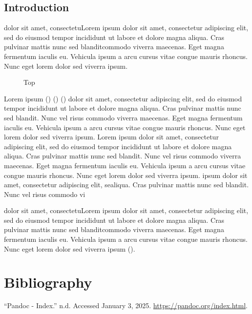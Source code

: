\subsection{Introduction}\label{introduction}

\hspace{0pt}dolor sit amet, consectetuLorem ipsum dolor sit amet,
consectetur adipiscing elit, sed do eiusmod tempor incididunt ut labore
et dolore magna aliqua. Cras pulvinar mattis nunc sed blanditcommodo
viverra maecenas. Eget magna fermentum iaculis eu. Vehicula ipsum a arcu
cursus vitae congue mauris rhoncus. Nunc eget lorem dolor sed viverra
ipsum. \hspace{0pt}

 \begin{wrapfigure}[25]{o}{5.4083333333333in}

\centering 

\caption{Top}\label{fig:top}

 \end{wrapfigure}

Lorem ipsum (\ada) (\tsa) (\trs) dolor sit amet, consectetur adipiscing
elit, sed do eiusmod tempor incididunt ut labore et dolore magna aliqua.
Cras \tsa pulvinar mattis nunc sed blandit. Nunc vel risus commodo
viverra maecenas. Eget magna fermentum iaculis eu. Vehicula ipsum a arcu
cursus vitae congue mauris rhoncus. Nunc eget lorem dolor sed viverra
ipsum. Lorem ipsum dolor sit amet, consectetur adipiscing elit, sed do
eiusmod tempor incididunt ut labore et dolore magna aliqua. Cras
pulvinar mattis nunc sed blandit. Nunc vel risus commodo viverra
maecenas. Eget magna fermentum iaculis eu. Vehicula ipsum a arcu cursus
vitae congue mauris rhoncus. Nunc eget lorem dolor sed viverra ipsum.
ipsum dolor sit amet, consectetur adipiscing elit, sealiqua. Cras
pulvinar mattis nunc sed blandit. Nunc vel risus commodo vi

dolor sit amet, consectetuLorem ipsum dolor sit amet, consectetur
adipiscing elit, sed do eiusmod tempor incididunt ut labore et dolore
magna aliqua. Cras pulvinar mattis nunc sed blanditcommodo viverra
maecenas. Eget magna fermentum iaculis eu. Vehicula ipsum a arcu cursus
vitae congue mauris rhoncus. Nunc eget lorem dolor sed viverra ipsum
().
\hspace{0pt}

\section*{Bibliography}\label{bibliography}

\label{refs}
\begin{CSLReferences}{1}{0}
{``Pandoc - Index.''} n.d. Accessed January 3, 2025.
\url{https://pandoc.org/index.html}.

\end{CSLReferences}
